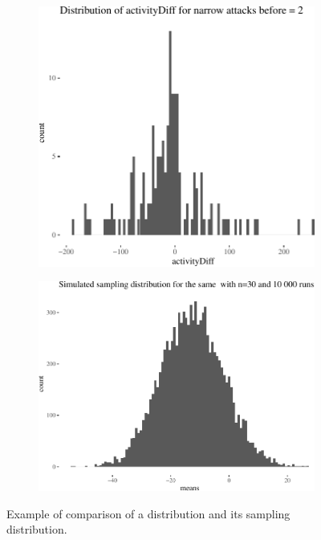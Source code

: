 \documentclass[10pt,]{scrartcl}
\begin{document}
\begin{figure}
\begin{subfigure}{0.4\textwidth}

\begin{center}\includegraphics{redditAnalysisWalkthrough_files/figure-latex/unnamed-chunk-39-1} \end{center}
\end{subfigure}\hfill
\begin{subfigure}{0.4\textwidth}

\begin{center}\includegraphics{redditAnalysisWalkthrough_files/figure-latex/unnamed-chunk-40-1} \end{center}
\end{subfigure}
\caption{Example of comparison of a distribution and its sampling distribution.}
\label{fig:sampling}
\end{figure}
\end{document}
